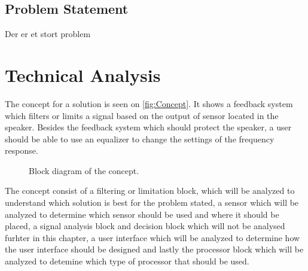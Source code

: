 





\section{Problem Statement}

Der er et stort problem
\chapter{Technical Analysis}
The concept for a solution is seen on \autoref{fig:Concept}. It shows a feedback system which filters or limits a signal based on the output of sensor located in the speaker. Besides the feedback system which should protect the speaker, a user should be able to use an equalizer to change the settings of the frequency response.  
\begin{figure}[H]
\centering
{}
\scalebox{0.8}{
}
\caption{Block diagram of the concept.}
\label{fig:Concept}
\end{figure}

The concept consist of a filtering or limitation block, which will be analyzed to understand which solution is best for the problem stated, a sensor which will be analyzed to determine which sensor should be used and where it should be placed, a signal analysis block and decision block which will not be analysed furhter in this chapter, a user interface which will be analyzed to determine how the user interface should be designed and lastly the processor block which will be analyzed to detemine which type of processor that should be used. 










